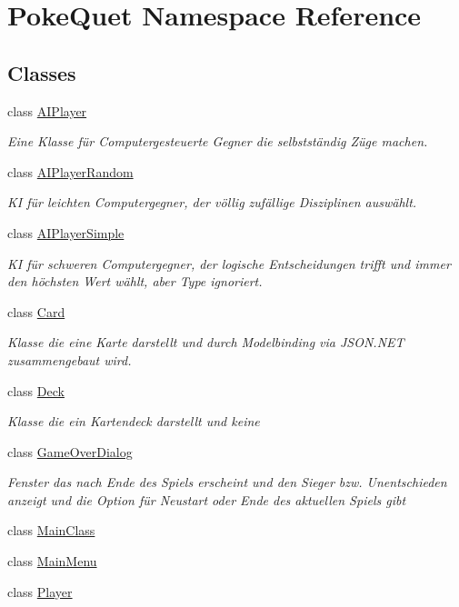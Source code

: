 \hypertarget{namespace_poke_quet}{}\section{Poke\+Quet Namespace Reference}
\label{namespace_poke_quet}
\subsection*{Classes}
\begin{DoxyCompactItemize}
\item 
class \mbox{\hyperlink{class_poke_quet_1_1_a_i_player}{A\+I\+Player}}
\begin{DoxyCompactList}\small\item\em Eine Klasse für Computergesteuerte Gegner die selbstständig Züge machen. \end{DoxyCompactList}\item 
class \mbox{\hyperlink{class_poke_quet_1_1_a_i_player_random}{A\+I\+Player\+Random}}
\begin{DoxyCompactList}\small\item\em KI für leichten Computergegner, der völlig zufällige Disziplinen auswählt. \end{DoxyCompactList}\item 
class \mbox{\hyperlink{class_poke_quet_1_1_a_i_player_simple}{A\+I\+Player\+Simple}}
\begin{DoxyCompactList}\small\item\em KI für schweren Computergegner, der logische Entscheidungen trifft und immer den höchsten Wert wählt, aber Type ignoriert. \end{DoxyCompactList}\item 
class \mbox{\hyperlink{class_poke_quet_1_1_card}{Card}}
\begin{DoxyCompactList}\small\item\em Klasse die eine Karte darstellt und durch Modelbinding via J\+S\+O\+N.\+N\+ET zusammengebaut wird. \end{DoxyCompactList}\item 
class \mbox{\hyperlink{class_poke_quet_1_1_deck}{Deck}}
\begin{DoxyCompactList}\small\item\em Klasse die ein Kartendeck darstellt und keine \end{DoxyCompactList}\item 
class \mbox{\hyperlink{class_poke_quet_1_1_game_over_dialog}{Game\+Over\+Dialog}}
\begin{DoxyCompactList}\small\item\em Fenster das nach Ende des Spiels erscheint und den Sieger bzw. Unentschieden anzeigt und die Option für Neustart oder Ende des aktuellen Spiels gibt \end{DoxyCompactList}\item 
class \mbox{\hyperlink{class_poke_quet_1_1_main_class}{Main\+Class}}
\item 
class \mbox{\hyperlink{class_poke_quet_1_1_main_menu}{Main\+Menu}}
\item 
class \mbox{\hyperlink{class_poke_quet_1_1_player}{Player}}
\end{DoxyCompactItemize}
